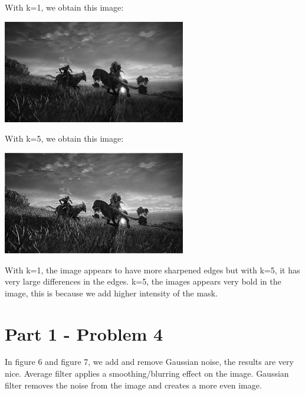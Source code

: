 \documentclass[conference]{IEEEtran}
\begin{document}
With k=1, we obtain this image:

\includegraphics[width=8cm, height=4.5cm]{images/eldenring_sharpen_1.jpg}

With k=5, we obtain this image:

\includegraphics[width=8cm, height=4.5cm]{images/eldenring_sharpen_5.jpg}

With k=1, the image appears to have more sharpened edges but with k=5, it has very large differences in the edges. k=5, the images appears very bold in the image, this is because we add higher intensity of the mask.

\section*{Part 1 - Problem 4}

In figure 6 and figure 7, we add and remove Gaussian noise, the results are very nice. Average filter applies a smoothing/blurring effect on the image. Gaussian filter removes the noise from the image and creates a more even image.
\end{document}
